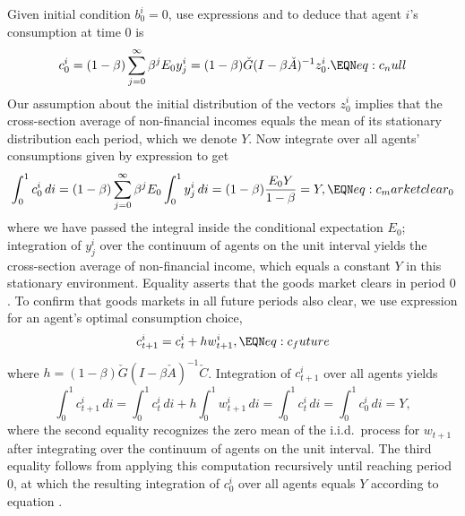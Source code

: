 Given initial condition $b^i_0 = 0$,  use  expressions
 and  to deduce that  agent $i$'s
consumption at time $0$ is 
$$ c^i_0 = (1-\beta) \sum_{j=0}^\infty \beta^j E_0 y^i_{j} 
         = (1-\beta) \check G(I-\beta \check A)^{-1} z^i_0.
                                         \EQN eq:c_null $$
Our assumption about the initial distribution of 
the vectors $z^i_0$ implies that the cross-section average of non-financial incomes equals the mean of its  stationary distribution each period, which we denote  $Y.$ Now  integrate over all agents' consumptions  given
by expression  to get 
$$ \int_0^1 c^i_0 \, di 
= (1-\beta) \sum_{j=0}^\infty \beta^j 
             E_0 \int_0^1 y^i_{j} \, di
= (1-\beta) {\frac{E_0 Y}{1-\beta}} = Y ,
                                    \EQN eq:c_marketclear_0
$$
where we have passed the integral inside the
conditional expectation $E_0$; 
integration of $y^i_{j}$ over the continuum of agents on
the unit interval yields the cross-section average of 
non-financial income, which  equals a constant $Y$ in 
this stationary environment. Equality  asserts that the goods market clears in period $0$.
To confirm that  goods markets in all future 
periods also clear, we use expression  
 for an agent's optimal 
consumption choice,
$$ c^i_{t+1} = c^i_t + h w^i_{t+1} ,  \EQN eq:c_future
$$
where $h = (1-\beta) \check G (I - \beta \check A)^{-1} 
\check C $. 
Integration of $c^i_{t+1}$ over all
agents yields
$$ \int_0^1 c^i_{t+1} \,di 
= \int_0^1 c^i_t \,di + h \int_0^1 w^i_{t+1} \,di
= \int_0^1 c^i_t \,di = \int_0^1 c^i_0 \,di =Y,
$$ 
where the second equality recognizes the zero mean 
of the i.i.d.~process for $w_{t+1}$ after 
integrating over the continuum of agents on the 
unit interval. The third equality follows from 
applying this computation recursively 
until reaching period $0$, at which the resulting 
integration of $c^i_0$ over all agents equals $Y$ 
according to equation . 



